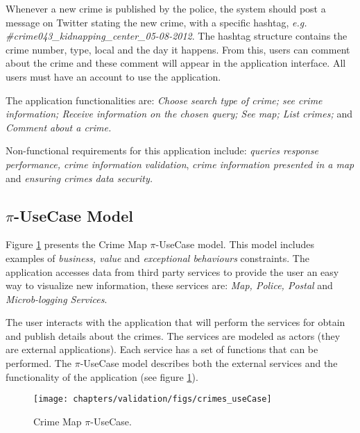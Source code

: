 Whenever a new crime is published by the police, the system should post a
 message on Twitter stating the new crime, with a specific hashtag,
 \textit{e.g.} \textit{\#crime043\_kidnapping\_center\_05-08-2012}. The hashtag
 structure contains the crime number, type, local and the day it happens. From
 this, users can comment about the crime and these comment will appear in the
 application interface. All users must have an account to use the application.

 The application functionalities are: \textit{Choose search type of crime; see
 crime information; Receive information on the chosen query; See map; List crimes;}
 and \textit{Comment about a crime.}
 
 Non-functional requirements for this application include: \textit{queries
 response performance, crime information validation}, \textit{crime
 information presented in a map} and \textit{ensuring crimes data security.}

\subsection{$\pi$-UseCase Model}
\label{sec:usecase_crimesMap}


 
 Figure \ref{fig:usecaseCrimeMap_total} presents the Crime Map $\pi$-UseCase
model. This model includes examples of \textit{business, value}
and \textit{exceptional behaviours} constraints. The application accesses
data from third party services to provide the user an easy way to visualize new
information, these services are: \textit{Map, Police, Postal} and
\textit{Microb-logging Services}. 

The user interacts with the application that will perform the services
for obtain and publish details about the crimes. The services are modeled as
actors (they are external applications). Each service has a set of functions
that can be performed. The $\pi$-UseCase model describes both the external services
and the functionality of the application (see figure
\ref{fig:usecaseCrimeMap_total}).

\begin{figure}[ht!]   
\centering
\texttt{[image: chapters/validation/figs/crimes\_useCase]}
\caption{Crime Map $\pi$-UseCase.}
\label{fig:usecaseCrimeMap_total}
\end{figure}  


